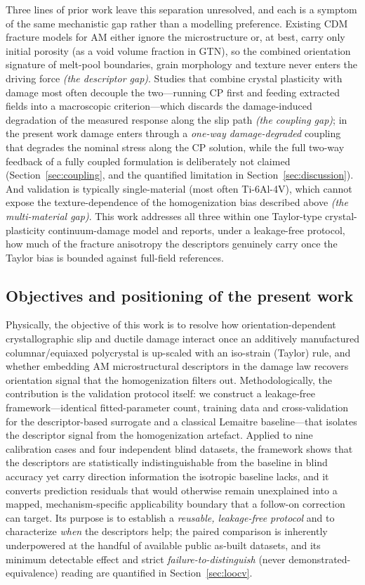 Three lines of prior work leave this separation unresolved, and each is a symptom of the same mechanistic gap rather than a modelling preference. Existing CDM fracture models for AM either ignore the microstructure or, at best, carry only initial porosity (as a void volume fraction in GTN), so the combined orientation signature of melt-pool boundaries, grain morphology and texture never enters the driving force \emph{(the descriptor gap)}. Studies that combine crystal plasticity with damage most often decouple the two---running CP first and feeding extracted fields into a macroscopic criterion---which discards the damage-induced degradation of the measured response along the slip path \emph{(the coupling gap)}; in the present work damage enters through a \emph{one-way damage-degraded} coupling that degrades the nominal stress along the CP solution, while the full two-way feedback of a fully coupled formulation is deliberately not claimed (Section~\ref{sec:coupling}, and the quantified limitation in Section~\ref{sec:discussion}). And validation is typically single-material (most often Ti-6Al-4V), which cannot expose the texture-dependence of the homogenization bias described above \emph{(the multi-material gap)}. This work addresses all three within one Taylor-type crystal-plasticity continuum-damage model and reports, under a leakage-free protocol, how much of the fracture anisotropy the descriptors genuinely carry once the Taylor bias is bounded against full-field references.

\subsection{Objectives and positioning of the present work}

Physically, the objective of this work is to resolve how orientation-dependent crystallographic slip and ductile damage interact once an additively manufactured columnar/equiaxed polycrystal is up-scaled with an iso-strain (Taylor) rule, and whether embedding AM microstructural descriptors in the damage law recovers orientation signal that the homogenization filters out. Methodologically, the contribution is the validation protocol itself: we construct a leakage-free framework---identical fitted-parameter count, training data and cross-validation for the descriptor-based surrogate and a classical Lemaitre baseline---that isolates the descriptor signal from the homogenization artefact. Applied to nine calibration cases and four independent blind datasets, the framework shows that the descriptors are statistically indistinguishable from the baseline in blind accuracy yet carry direction information the isotropic baseline lacks, and it converts prediction residuals that would otherwise remain unexplained into a mapped, mechanism-specific applicability boundary that a follow-on correction can target. Its purpose is to establish a \emph{reusable, leakage-free protocol} and to characterize \emph{when} the descriptors help; the paired comparison is inherently underpowered at the handful of available public as-built datasets, and its minimum detectable effect and strict \emph{failure-to-distinguish} (never demonstrated-equivalence) reading are quantified in Section~\ref{sec:loocv}.

